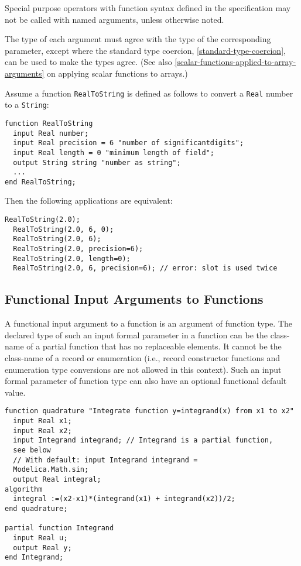 Special purpose operators with function syntax defined in the
specification may not be called with named arguments, unless otherwise
noted.

The type of each argument must agree with the type of the corresponding
parameter, except where the standard type coercion, \autoref{standard-type-coercion}, can be used to make
the types agree. (See also \autoref{scalar-functions-applied-to-array-arguments} on applying scalar functions
to arrays.)

\begin{example}
Assume a function \lstinline!RealToString! is defined as follows to
convert a \lstinline!Real! number to a \lstinline!String!:
\begin{lstlisting}[language=modelica]
function RealToString
  input Real number;
  input Real precision = 6 "number of significantdigits";
  input Real length = 0 "minimum length of field";
  output String string "number as string";
  ...
end RealToString;
\end{lstlisting}
Then the following applications are equivalent:
\begin{lstlisting}[language=modelica]
  RealToString(2.0);
  RealToString(2.0, 6, 0);
  RealToString(2.0, 6);
  RealToString(2.0, precision=6);
  RealToString(2.0, length=0);
  RealToString(2.0, 6, precision=6); // error: slot is used twice
\end{lstlisting}
\end{example}

\subsection{Functional Input Arguments to Functions}

A functional input argument to a function is an argument of function
type. The declared type of such an input formal parameter in a function
can be the class-name of a partial function that has no replaceable
elements. It cannot be the class-name of a record or enumeration
(i.e., record constructor functions and enumeration type
conversions are not allowed in this context). Such an input formal
parameter of function type can also have an optional functional default
value.

\begin{example}
\begin{lstlisting}[language=modelica]
  function quadrature "Integrate function y=integrand(x) from x1 to x2"
  input Real x1;
  input Real x2;
  input Integrand integrand; // Integrand is a partial function,
  see below
  // With default: input Integrand integrand =
  Modelica.Math.sin;
  output Real integral;
algorithm
  integral :=(x2-x1)*(integrand(x1) + integrand(x2))/2;
end quadrature;

partial function Integrand
  input Real u;
  output Real y;
end Integrand;
\end{lstlisting}
\end{example}

